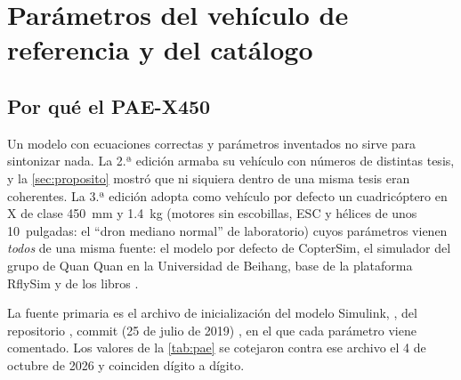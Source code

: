 \section{Parámetros del vehículo de referencia y del catálogo}
\label{sec:parametros}

\subsection{Por qué el PAE-X450}

Un modelo con ecuaciones correctas y parámetros inventados no sirve para
sintonizar nada. La 2.ª edición armaba su vehículo con números de distintas
tesis, y la \cref{sec:proposito} mostró que ni siquiera dentro de una misma
tesis eran coherentes. La 3.ª edición adopta como vehículo por defecto un
cuadricóptero en X de clase 450~mm y 1.4~kg (motores sin escobillas, ESC y
hélices de unos 10~pulgadas: el ``dron mediano normal'' de laboratorio) cuyos
parámetros vienen \emph{todos} de una misma fuente: el modelo por defecto de
CopterSim, el simulador del grupo de Quan Quan en la Universidad de Beihang,
base de la plataforma RflySim y de los libros \cite{qq17,qq20}.

La fuente primaria es el archivo de inicialización del modelo Simulink,
, del repositorio , commit
 (25 de julio de 2019) \cite{cs19}, en el que cada parámetro
viene comentado. Los valores de la \cref{tab:pae} se cotejaron contra ese
archivo el 4 de octubre de 2026 y coinciden dígito a dígito.

